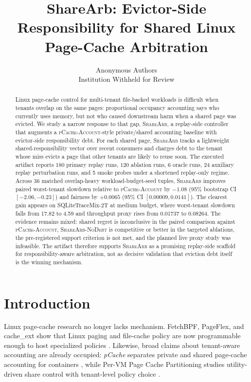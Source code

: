 \documentclass{article}
\title{ShareArb: Evictor-Side Responsibility for Shared Linux Page-Cache Arbitration}
\author{
Anonymous Authors \\
Institution Withheld for Review
}
\newcommand{\sharearb}{\textsc{ShareArb}\xspace}
\newcommand{\pcache}{\textsc{pCache-Account}\xspace}
\begin{document}
\maketitle

\begin{abstract}
Linux page-cache control for multi-tenant file-backed workloads is difficult when tenants overlap on the same pages: proportional occupancy accounting says who currently uses memory, but not who caused downstream harm when a shared page was evicted. We study a narrow response to that gap, \sharearb, a replay-side controller that augments a \pcache-style private/shared accounting baseline with evictor-side responsibility debt. For each shared page, \sharearb tracks a lightweight shared-responsibility vector over recent consumers and charges debt to the tenant whose miss evicts a page that other tenants are likely to reuse soon. The executed artifact reports 180 primary replay runs, 120 ablation runs, 6 oracle runs, 24 auxiliary replay perturbation runs, and 5 smoke probes under a shortened replay-only regime. Across 36 matched overlap-heavy workload-budget-seed tuples, \sharearb improves paired worst-tenant slowdown relative to \pcache by $-1.08$ (95\% bootstrap CI $[-2.06,-0.23]$) and fairness by $+0.0065$ (95\% CI $[0.00009,0.0141]$). The clearest gain appears on SQLiteTraceMix-2T at medium budget, where worst-tenant slowdown falls from 17.82 to 4.59 and throughput proxy rises from 0.01737 to 0.08264. The evidence remains mixed: shared regret is inconclusive in the paired comparison against \pcache, \textsc{ShareArb-NoDebt} is competitive or better in the targeted ablations, the pre-registered support criterion is not met, and the planned live proxy study was infeasible. The artifact therefore supports \sharearb as a promising replay-side scaffold for responsibility-aware arbitration, not as decisive validation that eviction debt itself is the winning mechanism.
\end{abstract}

\section{Introduction}

Linux page-cache research no longer lacks mechanism. FetchBPF, PageFlex, and cache\_ext show that Linux paging and file-cache policy are now programmable enough to host specialized policies \citep{cao2024fetchbpf,yelam2025pageflex,zussman2025cacheext}. Likewise, broad claims about tenant-aware accounting are already occupied: \textit{pCache} separates private and shared page-cache accounting for containers \citep{wang2024pcache}, while Per-VM Page Cache Partitioning studies utility-driven share control with tenant-level policy choice \citep{sharma2016pervm}.
\end{document}
